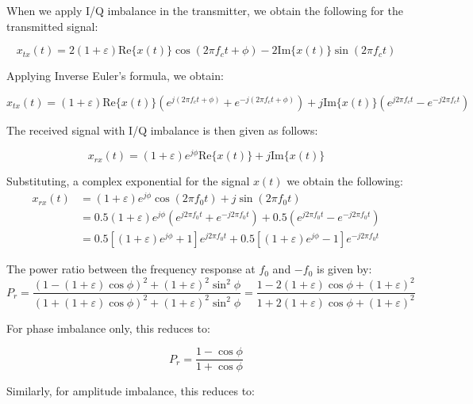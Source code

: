 \documentclass{article}
\begin{document}
When we apply I/Q imbalance in the transmitter, we obtain the following for the transmitted signal:

\begin{equation}
	x_{tx}(t) = 2(1+\varepsilon)\text{Re}\{x(t)\}\cos(2{\pi}f_ct + \phi) - 2\text{Im}\{x(t)\}\sin(2{\pi}f_ct)
\end{equation}

Applying Inverse Euler's formula, we obtain:

\begin{equation}
	x_{tx}(t) = (1+\varepsilon)\text{Re}\{x(t)\}(e^{j(2{\pi}f_ct+\phi)} + e^{-j(2{\pi}f_ct+\phi)}) + j\text{Im}\{x(t)\}(e^{j2{\pi}f_ct} - e^{-j2{\pi}f_ct})
\end{equation}

The received signal with I/Q imbalance is then given as follows:

\begin{equation}
	x_{rx}(t) = (1+\varepsilon)e^{j\phi}\text{Re}\{x(t)\} + j\text{Im}\{x(t)\}
\end{equation}

Substituting, a complex exponential for the signal $x(t)$ we obtain the following:
\begin{align}
	x_{rx}(t) &= (1+\varepsilon)e^{j\phi}\cos(2{\pi}f_0t) + j\sin(2{\pi}f_0t)  \label{eq::rx_signal_iq_imbalance} \\
	&= 0.5(1+\varepsilon)e^{j\phi}(e^{j2{\pi}f_0t} + e^{-j2{\pi}f_0t}) + 0.5(e^{j2{\pi}f_0t} - e^{-j2{\pi}f_0t})\\
	&= 0.5[(1+\varepsilon)e^{j\phi} + 1]e^{j2{\pi}f_0t} + 0.5[(1+\varepsilon)e^{j\phi} - 1]e^{-j2{\pi}f_0t}
\end{align}

The power ratio between the frequency response at $f_0$ and $-f_0$ is given by: 
\begin{equation}
	P_r = \frac{(1-(1+\varepsilon)\cos\phi)^2 + (1+\varepsilon)^2\sin^2\phi}{(1+(1+\varepsilon)\cos\phi)^2 + (1+\varepsilon)^2\sin^2\phi} = \frac{1-2(1+\varepsilon)\cos\phi+(1+\varepsilon)^2}{1+2(1+\varepsilon)\cos\phi+(1+\varepsilon)^2}
\end{equation}

For phase imbalance only, this reduces to:

\begin{equation}
	P_r = \frac{1-\cos\phi}{1+\cos\phi} \label{eq::image_power_ratio_phase_imbalance}
\end{equation}

Similarly, for amplitude imbalance, this reduces to:
\end{document}
